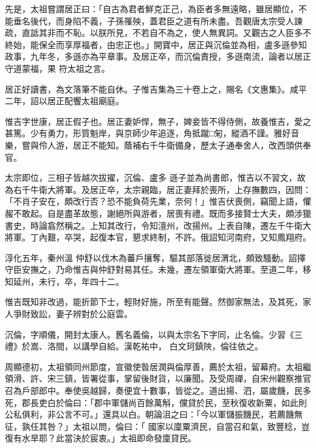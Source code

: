 \begin{pinyinscope}
 先是，太祖嘗謂居正曰：「自古為君者鮮克正己，為臣者多無遠略，雖居顯位，不能垂名後代，而身陷不義，子孫罹殃，蓋君臣之道有所未盡。吾觀唐太宗受人諫疏，直詆其非而不恥。以朕所見，不若自不為之，使人無異詞。又觀古之人臣多不終始，能保全而享厚福者，由忠正也。」開寶中，居正與沉倫並為相，盧多遜參知政事，九年冬，多遜亦為平章事。及居正卒，而沉倫責授，多遜南流，論者以居正守道蒙福，果
 符太祖之言。



 居正好讀書，為文落筆不能自休。子惟吉集為三十卷上之，賜名《文惠集》。咸平二年，詔以居正配饗太祖廟庭。



 惟吉字世康，居正假子也。居正妻妒悍，無子，婢妾皆不得侍側，故養惟吉，愛之甚篤。少有勇力，形質魁岸，與京師少年追逐，角抵蹴□匊，縱酒不謹。雅好音樂，嘗與伶人游，居正不能知。蔭補右千牛衛備身，歷太子通奉舍人，改西頭供奉官。



 太宗即位，三相子皆越次拔擢，沉倫、盧多
 遜子並為尚書郎，惟吉以不習文，故為右千牛衛大將軍。及居正卒，太宗親臨，居正妻拜於喪所，上存撫數四，因問：「不肖子安在，頗改行否？恐不能負荷先業，奈何！」惟吉伏喪側，竊聞上語，懼赧不敢起。自是盡革故態，謝絕所與游者，居喪有禮。既而多接賢士大夫，頗涉獵書史，時論翕然稱之。上知其改行，令知澶州，改揚州。上表自陳，遷左千牛衛大將軍。丁內艱，卒哭，起復本官，懇求終制，不許。俄詔知河南府，又知鳳翔府。



 淳化五年，秦州溫
 仲舒以伐木為蕃戶攘奪，驅其部落徙居渭北，頗致騷動。詔擇守臣安撫之，乃命惟吉與仲舒對易其任。未幾，遷左領軍衛大將軍。至道二年，移知延州，未行，卒，年四十二。



 惟吉既知非改過，能折節下士，輕財好施，所至有能聲。然御家無法，及其死，家人爭財致訟，妻子辨對於公庭雲。



 沉倫，字順儀，開封太康人。舊名義倫，以與太宗名下字同，止名倫。少習《三禮》於嵩、洛間，以講學自給。漢乾祐中，
 白文珂鎮陜，倫往依之。



 周顯德初，太祖領同州節度，宣徽使昝居潤與倫厚善，薦於太祖，留幕府。太祖繼領滑、許、宋三鎮，皆署從事，掌留後財貨，以廉聞。及受周禪，自宋州觀察推官召為戶部郎中。奉使吳越歸，奏便宜十數事，皆從之。道出揚、泗，屬歲饑，民多死，郡長吏白於倫曰：「郡中軍儲尚百餘萬斛，儻貸於民，至秋復收新粟，如此則公私俱利，非公言不可。」還具以白。朝論沮之曰：「今以軍儲振饑民，若薦饑無征，孰任其咎？」太祖以問，倫曰：「
 國家以廩粟濟民，自當召和氣，致豐稔，豈復有水旱耶？此當決於宸衷。」太祖即命發廩貸民。




\end{pinyinscope}
